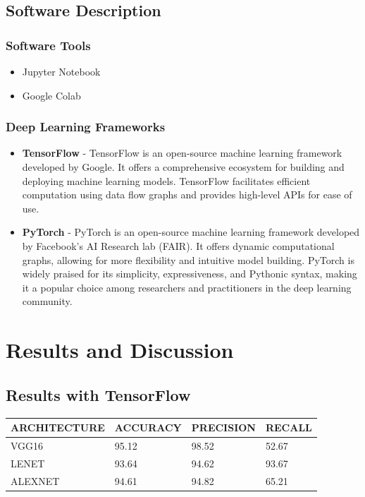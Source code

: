 \documentclass[12pt, a4paper]{report}
\begin{document}
\section{Software Description}
\subsection{Software Tools}
\begin{itemize}
    \item \text Jupyter Notebook
    \item \text Google Colab
\end{itemize}

\subsection{Deep Learning Frameworks}
\begin{itemize}
    \item \textbf{TensorFlow} - TensorFlow is an open-source machine learning framework developed by Google. It offers a comprehensive ecosystem for building and deploying machine learning models. TensorFlow facilitates efficient computation using data flow graphs and provides high-level APIs for ease of use.
    \item \textbf{PyTorch} - PyTorch is an open-source machine learning framework developed by Facebook's AI Research lab (FAIR). It offers dynamic computational graphs, allowing for more flexibility and intuitive model building. PyTorch is widely praised for its simplicity, expressiveness, and Pythonic syntax, making it a popular choice among researchers and practitioners in the deep learning community.
\end{itemize}



\chapter{Results and Discussion}
\section{Results with TensorFlow}
\begin{center}
\begin{tabular}{|l|l|l|l|}
\hline
ARCHITECTURE & ACCURACY & PRECISION & RECALL \\
\hline
VGG16 & 95.12 & 98.52 & 52.67 \\
\hline
LENET & 93.64 & 94.62 & 93.67 \\
\hline
ALEXNET & 94.61 & 94.82 & 65.21 \\
\hline
\end{tabular}
\end{center}
\end{document}

